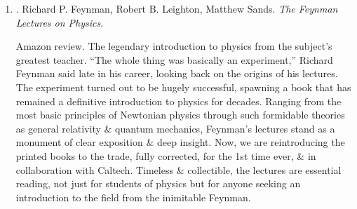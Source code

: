 \documentclass{article}
\begin{document}
\begin{enumerate}
	{\sf Editorial reviews.}
	\begin{itemize}
		\item ``1 of the greatest minds of the 20th century.'' -- {\it New York Review of Books}
		\item ``The essence of physics \& {\sc Feynman}. No jargon\footnote{words or expressions that are used by a particular profession or group of people, \& are difficult for others to understand. tiếng lóng.}, just ideas, excitement, \& the straight dope. \& real answers, like `we don't know.''' -- {\sc Stephen Wolfram}
		\item ``The most original mind of his generation.'' -- {\sc Freeman Dyson}
		\item ``If 1 book was all that could be passed onto the next generation of scientists it would undoubtedly have to be {\it6 Easy Pieces}.'' -- {\sc John Gribbin}, {\it New Scientist}
	\end{itemize}
	{\sf About the Author.} {\sc Richard P. Feynman} (1918--1988) was the Richard Chace Tolman Professor of Theoretical Physics at the California Institute of Technology. He was awarded the 1965 Nobel Prize for his work on the development of quantum field theory. He was also 1 of the most famous \& beloved figures of the 20th century, both in physics \& in the public arena.

	\item \cite{Feyman_Leighton_Sands_lecture_physics}. {\sc Richard P. Feynman, Robert B. Leighton, Matthew Sands}. {\it The Feynman Lectures on Physics}. {}

	{\sf Amazon review.} The legendary introduction to physics from the subject's greatest teacher. ``The whole thing was basically an experiment,'' {\sc Richard Feynman} said late in his career, looking back on the origins of his lectures. The experiment turned out to be hugely successful, spawning a book that has remained a definitive introduction to physics for decades. Ranging from the most basic principles of Newtonian physics through such formidable theories as general relativity \& quantum mechanics, {\sc Feynman}'s lectures stand as a monument of clear exposition \& deep insight. Now, we are reintroducing the printed books to the trade, fully corrected, for the 1st time ever, \& in collaboration with Caltech. Timeless \& collectible, the lectures are essential reading, not just for students of physics but for anyone seeking an introduction to the field from the inimitable {\sc Feynman}.


\end{enumerate}
\end{document}
